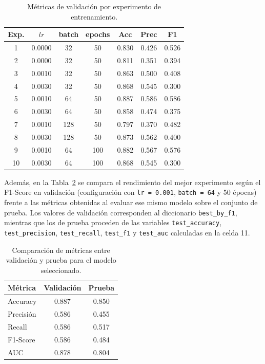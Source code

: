 \documentclass[conference]{IEEEtran}
\begin{document}
\begin{table}[ht]
    \centering
    \caption{Métricas de validación por experimento de entrenamiento.}
    \label{tab:val-metrics}
    \begin{tabular}{ccccccc}
        \hline
        Exp. & $lr$ & batch & epochs & Acc & Prec & F1 \\
        \hline
        1 & 0.0000 & 32  &  50 & 0.830 & 0.426 & 0.526 \\
        2 & 0.0000 & 32  &  50 & 0.811 & 0.351 & 0.394 \\
        3 & 0.0010 & 32  &  50 & 0.863 & 0.500 & 0.408 \\
        4 & 0.0030 & 32  &  50 & 0.868 & 0.545 & 0.300 \\
        5 & 0.0010 & 64  &  50 & 0.887 & 0.586 & 0.586 \\
        6 & 0.0030 & 64  &  50 & 0.858 & 0.474 & 0.375 \\
        7 & 0.0010 & 128 &  50 & 0.797 & 0.370 & 0.482 \\
        8 & 0.0030 & 128 &  50 & 0.873 & 0.562 & 0.400 \\
        9 & 0.0010 & 64  & 100 & 0.882 & 0.567 & 0.576 \\
        10& 0.0030 & 64  & 100 & 0.868 & 0.545 & 0.300 \\
        \hline
    \end{tabular}
\end{table}

Además, en la Tabla~\ref{tab:best-val-test} se compara el rendimiento del
mejor experimento según el F1-Score en validación (configuración con
\texttt{lr = 0.001}, \texttt{batch = 64} y 50 épocas) frente a las métricas
obtenidas al evaluar ese mismo modelo sobre el conjunto de prueba. Los valores
de validación corresponden al diccionario \texttt{best\_by\_f1}, mientras que
los de prueba proceden de las variables \texttt{test\_accuracy},
\texttt{test\_precision}, \texttt{test\_recall}, \texttt{test\_f1} y
\texttt{test\_auc} calculadas en la celda 11.

\begin{table}[ht]
    \centering
    \caption{Comparación de métricas entre validación y prueba para el modelo
    seleccionado.}
    \label{tab:best-val-test}
    \begin{tabular}{lcc}
        \hline
        Métrica & Validación & Prueba \\
        \hline
        Accuracy   & 0.887 & 0.850 \\
        Precisión  & 0.586 & 0.455 \\
        Recall     & 0.586 & 0.517 \\
        F1-Score   & 0.586 & 0.484 \\
        AUC        & 0.878 & 0.804 \\
        \hline
    \end{tabular}
\end{table}
\end{document}
